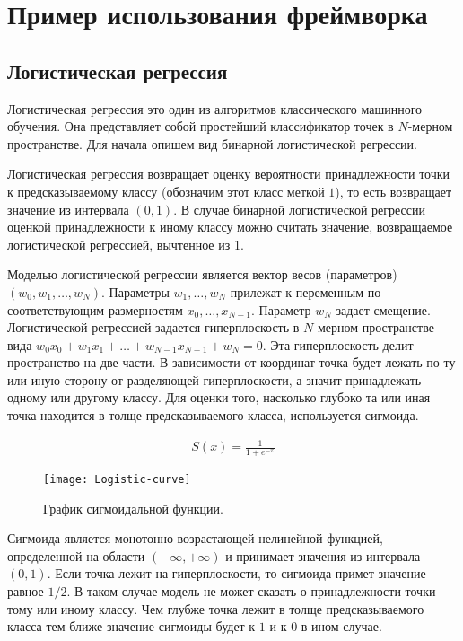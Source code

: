 \clearpage
\section{Пример использования фреймворка}
\subsection{Логистическая регрессия}
Логистическая регрессия это один из алгоритмов классического машинного обучения. Она представляет собой простейший классификатор точек в $N$-мерном пространстве. Для начала опишем вид бинарной логистической регрессии. 

Логистическая регрессия возвращает оценку вероятности принадлежности точки к предсказываемому классу (обозначим этот класс меткой $1$), то есть возвращает значение из интервала $(0, 1)$. В случае бинарной логистической регрессии оценкой принадлежности к иному классу можно считать значение, возвращаемое логистической регрессией, вычтенное из 1. 

Моделью логистической регрессии является вектор весов (параметров) $(w_0,w_1, \ldots, w_N)$. Параметры $w_1, \ldots, w_N$ прилежат к переменным по соответствующим размерностям $x_0, \ldots, x_{N-1}$. Параметр $w_N$ задает смещение. Логистической регрессией задается гиперплоскость в $N$-мерном пространстве вида $w_0x_0+w_1x_1+\ldots+w_{N-1}x_{N-1}+w_N=0$. Эта гиперплоскость делит пространство на две части. В зависимости от координат точка будет лежать по ту или иную сторону от разделяющей гиперплоскости, а значит принадлежать одному или другому классу. Для оценки того, насколько глубоко та или иная точка находится в толще предсказываемого класса, используется сигмоида. 

\begin{gather*}
S(x)=\frac{1}{1+e^{-x}}
\end{gather*}

\begin{figure}[h]
    \centering
    \texttt{[image: Logistic-curve]}
    \caption{График сигмоидальной функции.}
    \label{sigmoid_func}
\end{figure}

Сигмоида является монотонно возрастающей нелинейной функцией, определенной на области $(-\infty, +\infty)$ и принимает значения из интервала $(0, 1)$. Если точка лежит на гиперплоскости, то сигмоида примет значение равное $1/2$. В таком случае модель не может сказать о принадлежности точки тому или иному классу. Чем глубже точка лежит в толще предсказываемого класса тем ближе значение сигмоиды будет к $1$ и к $0$ в ином случае.

